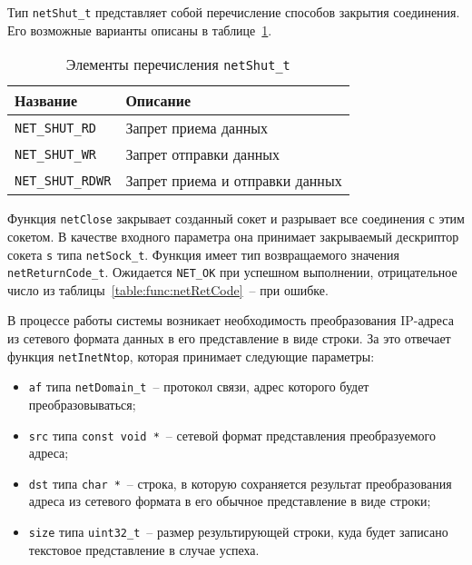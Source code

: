 Тип \lstinline{netShut_t} представляет собой перечисление способов закрытия соединения. Его возможные варианты описаны в таблице~\ref{table:func:netShut}.

\begin{table}[ht]
    \caption{Элементы перечисления \lstinline{netShut_t}}
    \label{table:func:netShut}
    \begin{tabular}{| >{\raggedright}m{}
                    | >{\raggedright\arraybackslash}m{}|}
        \hline
        \centering Название & \centering\arraybackslash Описание \\

        \hline
        \lstinline[]$NET_SHUT_RD$ &
        Запрет приема данных
        \\

        \hline
        \lstinline[]$NET_SHUT_WR$ &
        Запрет отправки данных
        \\

        \hline
        \lstinline[]$NET_SHUT_RDWR$ &
        Запрет приема и отправки данных
        \\

        \hline
    \end{tabular}
\end{table}

Функция \lstinline{netClose} закрывает созданный сокет и разрывает все соединения с этим сокетом. В качестве входного параметра она принимает
закрываемый дескриптор сокета \lstinline{s} типа \lstinline{netSock_t}. Функция имеет тип возвращаемого значения \lstinline{netReturnCode_t}. Ожидается \lstinline{NET_OK} при успешном выполнении,
отрицательное число из таблицы~\ref{table:func:netRetCode}~-- при ошибке.

В процессе работы системы возникает необходимость преобразования IP-адреса из сетевого формата данных в его представление в виде строки. За это отвечает функция
\lstinline{netInetNtop}, которая принимает следующие параметры:

\begin{itemize}
    \item \lstinline{af} типа \lstinline{netDomain_t}~-- протокол связи, адрес которого будет преобразовываться;
    \item \lstinline{src} типа \lstinline{const void *}~-- сетевой формат представления преобразуемого адреса;
    \item \lstinline{dst} типа \lstinline{char *}~-- строка, в которую сохраняется результат преобразования адреса из сетевого формата в его обычное представление
    в виде строки;
    \item \lstinline{size} типа \lstinline{uint32_t}~-- размер результирующей строки, куда будет записано текстовое представление в случае успеха.
\end{itemize}

